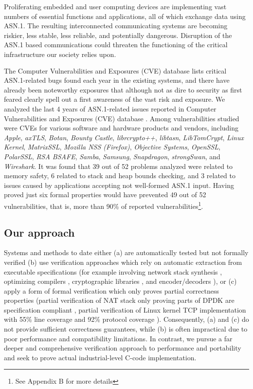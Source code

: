 \documentclass[acmsmall,nonacm]{acmart}
\begin{document}
Proliferating embedded and user computing devices are implementing
vast numbers of essential functions and applications, all of which
exchange data using ASN.1. The resulting interconnected communicating
systems are becoming riskier, less stable, less reliable, and
potentially dangerous. Disruption of the ASN.1 based communications
could threaten the functioning of the critical infrastructure our
society relies upon.


The Computer Vulnerabilities and Exposures (CVE) database
\cite{CVE} lists critical ASN.1-related bugs found each year in
the existing systems, and there have already been noteworthy exposures
\cite{OpenSSLMemoryCorruption} that although not as dire to security as first feared
\cite{ASN1Flaw} clearly spell out a first awareness of the vast risk and
exposure. We analyzed the last 4 years of ASN.1-related issues
reported in Computer Vulnerabilities and Exposures (CVE) database
\cite{CVEaddon}. Among vulnerabilities studied were CVEs for various
software and hardware products and vendors, including \textit{Apple},
\textit{axTLS}, \textit{Botan}, \textit{Bounty Castle},
\textit{librcrypto++}, \textit{libtasn}, \textit{LibTomCrypt},
\textit{Linux Kernel}, \textit{MatrixSSL}, \textit{Mozilla NSS
  (Firefox)}, \textit{Objective Systems}, \textit{OpenSSL},
\textit{PolarSSL}, \textit{RSA BSAFE}, \textit{Samba},
\textit{Samsung}, \textit{Snapdragon}, \textit{strongSwan}, and
\textit{Wireshark}. It was found that 39 out of 52 problems analyzed
were related to memory safety, 6 related to stack and heap bounds
checking, and 3 related to issues caused by applications accepting not
well-formed ASN.1 input. Having proved just six formal properties
would have prevented 49 out of 52 vulnerabilities, that is, more than
90\% of reported vulnerabilities\footnote{See Appendix B for more details}.

\subsection{Our approach}
\label{sec:approach}
Systems and methods to date either (a) are automatically tested but not
formally verified (b) use verification approaches which rely on
automatic extraction from executable specifications (for example
involving network stack synthesis \cite{VNSSforSel4}, optimizing compilers
\cite{CompCert}, cryptographic libraries \cite{HACL}, and
encoder/decoders \cite{Narcissus}), or (c) apply a form of formal
verification which only proves partial correctness properties (partial
verification of NAT stack only proving parts of DPDK are specification
compliant \cite{NAT}, partial verification of Linux kernel TCP
implementation with 55\% line coverage and 92\% protocol coverage
\cite{NSDI}). Consequently, (a) and (c) do not provide sufficient
correctness guarantees, while (b) is often impractical due to poor
performance and compatibility limitations. In contrast, we pursue a
far deeper and comprehensive verification approach to performance and
portability and seek to prove actual industrial-level C-code
implementation.
\end{document}
